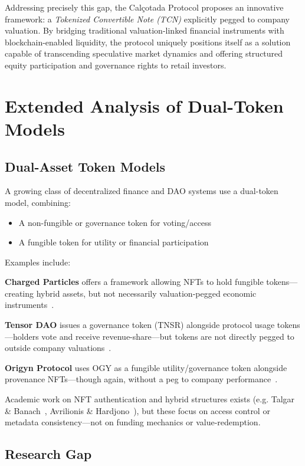 \documentclass[conference]{IEEEtran}
\begin{document}
Addressing precisely this gap, the Calçotada Protocol proposes an innovative framework: a \textit{Tokenized Convertible Note (TCN)} explicitly pegged to company valuation. By bridging traditional valuation-linked financial instruments with blockchain-enabled liquidity, the protocol uniquely positions itself as a solution capable of transcending speculative market dynamics and offering structured equity participation and governance rights to retail investors.

\section{Extended Analysis of Dual-Token Models}

\subsection{Dual-Asset Token Models}

A growing class of decentralized finance and DAO systems use a dual-token model, combining:

\begin{itemize}
    \item A non-fungible or governance token for voting/access
    \item A fungible token for utility or financial participation
\end{itemize}

Examples include:

\textbf{Charged Particles} offers a framework allowing NFTs to hold fungible tokens—creating hybrid assets, but not necessarily valuation‑pegged economic instruments~\cite{chargedparticles2022}.

\textbf{Tensor DAO} issues a governance token (TNSR) alongside protocol usage tokens—holders vote and receive revenue-share—but tokens are not directly pegged to outside company valuations~\cite{tensor2025}.

\textbf{Origyn Protocol} uses OGY as a fungible utility/governance token alongside provenance NFTs—though again, without a peg to company performance~\cite{origyn2022}.

Academic work on NFT authentication and hybrid structures exists (e.g. Talgar \& Banach~\cite{talgar2024dao}, Avrilionis \& Hardjono~\cite{avrilionis2022assetproxy}), but these focus on access control or metadata consistency—not on funding mechanics or value-redemption.

\subsection{Research Gap}
\end{document}
